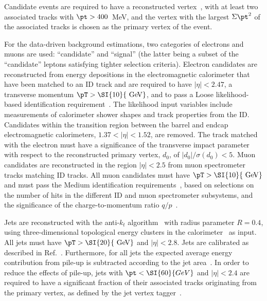 Candidate events are required to have a reconstructed vertex~\cite{ATL-PHYS-PUB-2015-026}, 
with at least two associated tracks with $\pt >400$~MeV, 
and the vertex with the largest $\Sigma \pt^2$ of the associated tracks is chosen as the primary vertex of the event.

For the data-driven background estimations, two categories of electrons and muons are used: 
``candidate'' and ``signal'' (the latter being a subset of the ``candidate'' leptons satisfying tighter selection criteria). 
Electron candidates are reconstructed from energy depositions in the electromagnetic calorimeter that have been matched to an ID track 
and are required to have $|\eta|<2.47$, a transverse momentum $\pT>\SI{10}{\GeV}$,
and to pass a Loose likelihood-based identification requirement~\cite{ATLAS-CONF-2016-024}. 
The likelihood input variables include measurements of calorimeter shower shapes and track properties from the ID. 
Candidates within the transition region between the barrel and endcap electromagnetic calorimeters,
$1.37<|\eta|<1.52$, are removed. The track matched with the electron must have a significance of the transverse impact parameter 
with respect to the reconstructed primary vertex, $d_0$, of $\vert d_0\vert/\sigma(d_0) < 5$.
Muon candidates are reconstructed in the region $|\eta|<2.5$ 
from muon spectrometer tracks matching ID tracks.
All muon candidates must have $\pT>\SI{10}{\GeV}$ and must pass the Medium identification requirements~\cite{Aad:2016jkr}, 
based on selections on the number of hits in the different ID and muon spectrometer subsystems, 
and the significance of the charge-to-momentum ratio $q/p$~\cite{Aad:2016jkr}.

Jets are reconstructed with the anti-$k_t$
algorithm~\cite{Cacciari:2008} with radius parameter $R=0.4$, using three-dimensional topological energy
clusters in the calorimeter~\cite{PERF-2014-07} as input. 
All jets must have $\pT>\SI{20}{\GeV}$ and $|\eta|<2.8$.
Jets are calibrated as described in Ref.~\cite{ATLAS-PHYS-PUB-2015-015}.
Furthermore, for all jets the expected average energy contribution from
pile-up is subtracted according to the jet area~\cite{ATLAS-PHYS-PUB-2015-015}.
In order to reduce the effects of pile-up, jets with $\pt<\SI{60}{GeV}$ and $|\eta|<2.4$ are required to have a significant fraction of their 
associated tracks originating from the primary vertex, 
as defined by the jet vertex tagger~\cite{ATLAS-CONF-2014-018}. 

